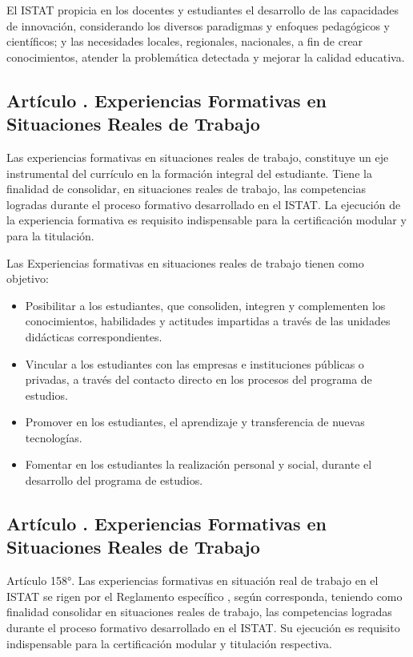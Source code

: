 El ISTAT propicia en los docentes y estudiantes el desarrollo de las capacidades de innovación, considerando los diversos paradigmas y enfoques pedagógicos y científicos; y las necesidades locales, regionales, nacionales, a fin de crear conocimientos, atender la problemática detectada y mejorar la calidad educativa. 
\subsection{Artículo . Experiencias Formativas en Situaciones Reales de Trabajo}
\addtocounter{ns}{1}
Las experiencias formativas en situaciones reales de trabajo, constituye un eje instrumental del currículo en la formación integral del estudiante. Tiene la finalidad de consolidar, en situaciones reales de trabajo, las competencias logradas durante el proceso formativo desarrollado en el ISTAT. La ejecución de la experiencia formativa es requisito indispensable para la certificación modular y para la titulación. 

Las Experiencias formativas en situaciones reales de trabajo tienen como objetivo: 
\begin{itemize}
\item Posibilitar a los estudiantes, que consoliden, integren y complementen los conocimientos, habilidades y actitudes impartidas a través de las unidades didácticas correspondientes. 
\item Vincular a los estudiantes con las empresas e instituciones públicas o privadas, a través del contacto directo en los procesos del programa de estudios. 
\item Promover en los estudiantes, el aprendizaje y transferencia de nuevas tecnologías. 
\item Fomentar en los estudiantes la realización personal y social, durante el desarrollo del programa de estudios. 
\end{itemize}
\subsection{Artículo . Experiencias Formativas en Situaciones Reales de Trabajo}
\addtocounter{ns}{1}
Artículo 158°.	Las experiencias formativas en situación real de trabajo en el ISTAT se rigen por el Reglamento específico , según corresponda, teniendo como finalidad consolidar en situaciones reales de trabajo, las competencias logradas durante el proceso formativo desarrollado en el ISTAT. Su ejecución es requisito indispensable para la certificación modular y titulación respectiva. 

